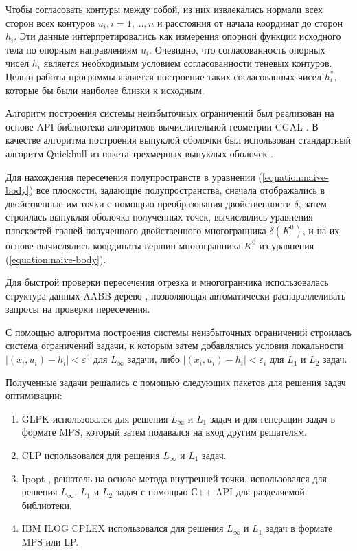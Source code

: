 \documentclass[a4paper, 10pt]{article}
\theoremstyle{definition}
\theoremstyle{plain}
\theoremstyle{plain}
\begin{document}
Чтобы согласовать контуры между собой, из них извлекались нормали всех сторон
всех контуров $u_{i}, i = 1, \ldots, n$ и расстояния от начала координат до
сторон $h_{i}$. Эти данные интерпретировались как измерения опорной функции
исходного тела по опорным направлениям $u_{i}$. Очевидно, что согласованность
опорных чисел $h_{i}$ является необходимым условием согласованности теневых
контуров. Целью работы программы является построение таких согласованных чисел
$h^{*}_{i}$, которые бы были наиболее близки к исходным.

Алгоритм построения системы неизбыточных ограничений был реализован на
основе API библиотеки алгоритмов вычислительной геометрии CGAL \cite{cgal}. В 
качестве алгоритма построения выпуклой оболочки был использован стандартный
алгоритм Quickhull \cite{Barber:1996:QAC:235815.235821} из пакета трехмерных
выпуклых оболочек \cite{cgal:hs-ch3-15a}.

Для нахождения пересечения
полупространств в уравнении (\ref{equation:naive-body}) все плоскости, задающие
полупространства, сначала отображались в двойственные им точки с помощью 
преобразования двойственности $\delta$, затем строилась выпуклая оболочка
полученных точек, вычислялись уравнения плоскостей граней полученного
двойственного многогранника $\delta(K^{0})$, и на их основе
вычислялись координаты вершин многогранника $K^{0}$ из уравнения
(\ref{equation:naive-body}).

Для быстрой проверки пересечения
отрезка и многогранника использовалась структура данных AABB-дерево
\cite{cgal:atw-aabb-15a}, позволяющая автоматически распараллеливать запросы
на проверки пересечения.

С помощью алгоритма построения системы неизбыточных ограничений строилась
система ограничений задачи, к которым затем добавлялись условия локальности
$|(x_{i}, u_{i}) - h_{i}| < \varepsilon^{0}$ для $L_{\infty}$ задачи, либо
$|(x_{i}, u_{i}) - h_{i}| < \varepsilon_{i}$ для $L_{1}$ и $L_{2}$ задач.

Полученные задачи решались с помощью следующих пакетов для решения задач
оптимизации:

\begin{enumerate}
 \item GLPK \cite{glpk} использовался для решения $L_{\infty}$ и $L_{1}$ задач
 и для генерации задач в формате MPS, который затем подавался на вход другим
 решателям.
 \item CLP \cite{clp} использовался для решения $L_{\infty}$ и $L_{1}$ задач.
 \item Ipopt \cite{ipopt, DBLP:journals/mp/WachterB06}, решатель на основе
 метода внутренней точки, использовался для решения $L_{\infty}$, $L_{1}$ и
 $L_{2}$ задач с помощью С++ API для разделяемой библиотеки.
 \item IBM ILOG CPLEX \cite{cplex} использовался для решения
 $L_{\infty}$ и $L_{1}$ задач в формате MPS или LP.
\end{enumerate}
\end{document}
